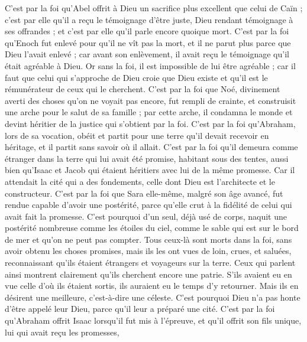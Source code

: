 \begin{multicols}{2}
C’est par la foi qu’Abel offrit à Dieu un sacrifice plus excellent que celui de Caïn ; c’est par elle qu’il a reçu le témoignage d’être juste, Dieu rendant témoignage à ses offrandes ; et c’est par elle qu’il parle encore quoique mort.
C’est par la foi qu’Enoch fut enlevé pour qu’il ne vît pas la mort, et il ne parut plus parce que Dieu l’avait enlevé ; car avant son enlèvement, il avait reçu le témoignage qu’il était agréable à Dieu.
Or sans la foi, il est impossible de lui être agréable ; car il faut que celui qui s’approche de Dieu croie que Dieu existe et qu'il est le rémunérateur de ceux qui le cherchent.
C’est par la foi que Noé, divinement averti des choses qu’on ne voyait pas encore, fut rempli de crainte, et construisit une arche pour le salut de sa famille ; par cette arche, il condamna le monde et devint héritier de la justice qui s’obtient par la foi.
C’est par la foi qu’Abraham, lors de sa vocation, obéit et partit pour une terre qu'il devait recevoir en héritage, et il partit sans savoir où il allait.
C’est par la foi qu’il demeura comme étranger dans la terre qui lui avait été promise, habitant sous des tentes, aussi bien qu’Isaac et Jacob qui étaient héritiers avec lui de la même promesse.
Car il attendait la cité qui a des fondements, celle dont Dieu est l'architecte et le constructeur.
C’est par la foi que Sara elle-même, malgré son âge avancé, fut rendue capable d’avoir une postérité, parce qu’elle crut à la fidélité de celui qui avait fait la promesse.
C'est pourquoi d'un seul, déjà usé de corps, naquit une postérité nombreuse comme les étoiles du ciel, comme le sable qui est sur le bord de mer et qu’on ne peut pas compter.
Tous ceux-là sont morts dans la foi, sans avoir obtenu les choses promises, mais ils les ont vues de loin, crues, et saluées, reconnaissant qu'ils étaient étrangers et voyageurs sur la terre.
Ceux qui parlent ainsi montrent clairement qu'ils cherchent encore une patrie.
S’ils avaient eu en vue celle d’où ils étaient sortis, ils auraient eu le temps d’y retourner.
Mais ils en désirent une meilleure, c'est-à-dire une céleste. C’est pourquoi Dieu n’a pas honte d'être appelé leur Dieu, parce qu'il leur a préparé une cité.
C’est par la foi qu’Abraham offrit Isaac lorsqu’il fut mis à l’épreuve, et qu’il offrit son fils unique, lui qui avait reçu les promesses,

\end{multicols}
